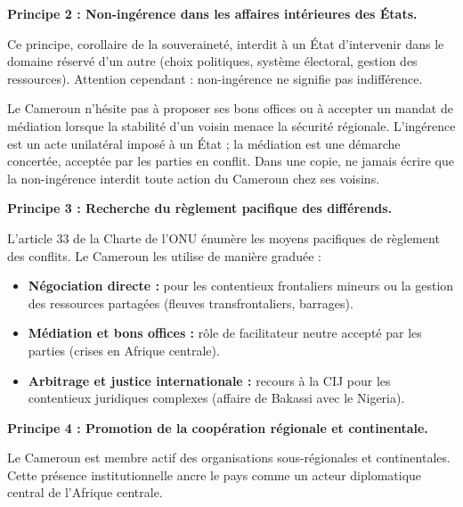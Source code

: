 \documentclass[11pt]{article}
\newcommand{\cle}[1]{{\popxbold\color{popdark}#1}}
\begin{document}
\textbf{Principe 2 : Non-ingérence dans les affaires intérieures des États.}\par
Ce principe, corollaire de la souveraineté, interdit à un État d'intervenir dans le domaine réservé d'un autre (choix politiques, système électoral, gestion des ressources). Attention cependant : \cle{non-ingérence ne signifie pas indifférence}.

\begin{attention}
Le Cameroun n'hésite pas à proposer ses \cle{bons offices} ou à accepter un mandat de médiation lorsque la stabilité d'un voisin menace la sécurité régionale. L'ingérence est un acte unilatéral imposé à un État ; la médiation est une démarche concertée, acceptée par les parties en conflit. Dans une copie, ne jamais écrire que la non-ingérence interdit toute action du Cameroun chez ses voisins.
\end{attention}

\textbf{Principe 3 : Recherche du règlement pacifique des différends.}\par
L'article 33 de la Charte de l'ONU énumère les moyens pacifiques de règlement des conflits. Le Cameroun les utilise de manière graduée :
\begin{itemize}
    \item \textbf{Négociation directe :} pour les contentieux frontaliers mineurs ou la gestion des ressources partagées (fleuves transfrontaliers, barrages).
    \item \textbf{Médiation et bons offices :} rôle de facilitateur neutre accepté par les parties (crises en Afrique centrale).
    \item \textbf{Arbitrage et justice internationale :} recours à la CIJ pour les contentieux juridiques complexes (affaire de Bakassi avec le Nigeria).
\end{itemize}

\textbf{Principe 4 : Promotion de la coopération régionale et continentale.}\par
Le Cameroun est membre actif des organisations sous-régionales et continentales. Cette présence institutionnelle ancre le pays comme un acteur diplomatique central de l'Afrique centrale.
\end{document}
